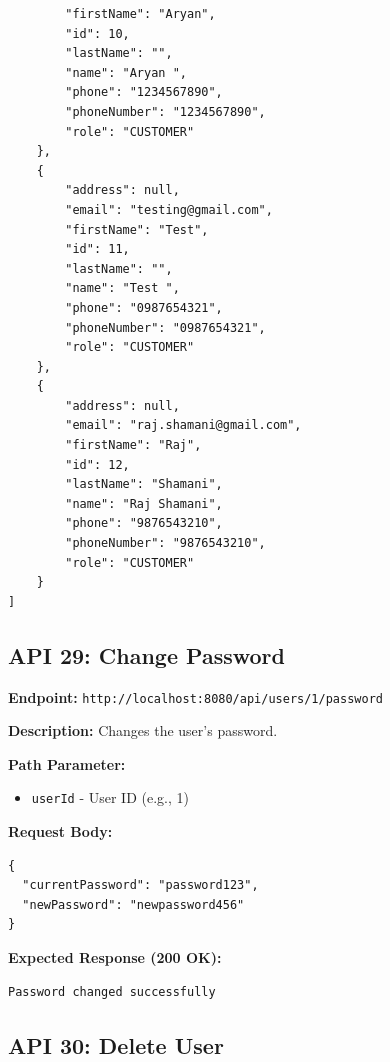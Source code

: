 \documentclass[12pt, a4paper]{article}
\begin{document}
\begin{lstlisting}
        "firstName": "Aryan",
        "id": 10,
        "lastName": "",
        "name": "Aryan ",
        "phone": "1234567890",
        "phoneNumber": "1234567890",
        "role": "CUSTOMER"
    },
    {
        "address": null,
        "email": "testing@gmail.com",
        "firstName": "Test",
        "id": 11,
        "lastName": "",
        "name": "Test ",
        "phone": "0987654321",
        "phoneNumber": "0987654321",
        "role": "CUSTOMER"
    },
    {
        "address": null,
        "email": "raj.shamani@gmail.com",
        "firstName": "Raj",
        "id": 12,
        "lastName": "Shamani",
        "name": "Raj Shamani",
        "phone": "9876543210",
        "phoneNumber": "9876543210",
        "role": "CUSTOMER"
    }
]
\end{lstlisting}

\vspace{0.5cm}

\subsection{API 29: Change Password}

\begin{tcolorbox}[colback=putcolor!10, colframe=putcolor, title=PUT]
\textbf{Endpoint:} \texttt{http://localhost:8080/api/users/1/password}
\end{tcolorbox}

\textbf{Description:} Changes the user's password.

\textbf{Path Parameter:}
\begin{itemize}
    \item \texttt{userId} - User ID (e.g., 1)
\end{itemize}

\textbf{Request Body:}
\begin{lstlisting}
{
  "currentPassword": "password123",
  "newPassword": "newpassword456"
}
\end{lstlisting}

\textbf{Expected Response (200 OK):}
\begin{lstlisting}
Password changed successfully
\end{lstlisting}

\vspace{0.5cm}

\subsection{API 30: Delete User}
\end{document}
